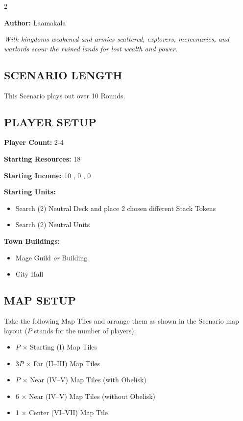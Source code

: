
\begin{multicols}{2}

\textbf{Author:} Laamakala

\textit{With kingdoms weakened and armies scattered, explorers, mercenaries, and warlords scour the ruined lands for lost wealth and power.}

\subsection*{\MakeUppercase{Scenario Length}}
This Scenario plays out over 10 Rounds.

\subsection*{\MakeUppercase{Player Setup}}
\textbf{Player Count:} 2-4

\textbf{Starting Resources:} 18 

\textbf{Starting Income:} 10 , 0 , 0 

\textbf{Starting Units:}
\begin{itemize}
  \item Search (2) Neutral  Deck and place 2 chosen different Stack Tokens
  \item Search (2) Neutral  Units
\end{itemize}

\textbf{Town Buildings:}
\begin{itemize}
  \item Mage Guild \textit{or}  Building
  \item City Hall
\end{itemize}

\subsection*{\MakeUppercase{Map Setup}}
Take the following Map Tiles and arrange them as shown in the Scenario map layout ($P$ stands for the number of players):

\begin{itemize}
  \item $P$ × Starting (I) Map Tiles
  \item 3$P$ × Far (II--III) Map Tiles
  \item $P$ × Near (IV--V) Map Tiles (with Obelisk)
  \item 6 × Near (IV--V) Map Tiles (without Obelisk)
  \item 1 × Center (VI--VII) Map Tile
\end{itemize}


\end{multicols}
